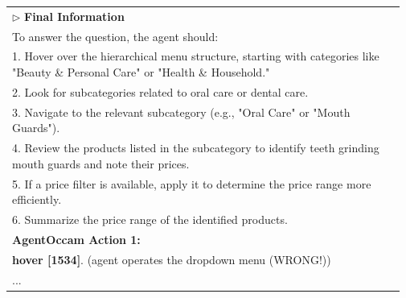 \begin{table}[t]
\begin{tabularx}{\linewidth}{p{0.97\linewidth}}
\(\triangleright\) \textbf{Final Information}\\
To answer the question, the agent should:\\
1. Hover over the hierarchical menu structure, starting with categories like "Beauty \& Personal Care" or "Health \& Household."\\
2. Look for subcategories related to oral care or dental care.\\
3. Navigate to the relevant subcategory (e.g., "Oral Care" or "Mouth Guards").\\
4. Review the products listed in the subcategory to identify teeth grinding mouth guards and note their prices.\\
5. If a price filter is available, apply it to determine the price range more efficiently.\\
6. Summarize the price range of the identified products.\\
\midrule
\textbf{AgentOccam Action 1:}\\
\textbf{hover [1534]}. (agent operates the dropdown menu (WRONG!))\\
\midrule
...\\
\bottomrule
\end{tabularx}
\end{table}